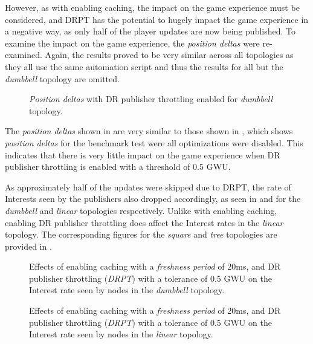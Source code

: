 However, as with enabling caching, the impact on the game experience must be considered, and DRPT has the potential to hugely impact the game experience in a negative way, as only half of the player updates are now being published. To examine the impact on the game experience, the \textit{position deltas} were re-examined. Again, the results proved to be very similar across all topologies as they all use the same automation script and thus the results for all but the \textit{dumbbell} topology are omitted.

\begin{figure}[H]
    \centering
    \caption{\textit{Position deltas} with DR publisher throttling enabled for \textit{dumbbell} topology.}
    \label{fig:eval:caching:dr-pub-throt:pos-deltas:dumbbell}
\end{figure}

The \textit{position deltas} shown in  are very similar to those shown in , which shows \textit{position deltas} for the benchmark test were all optimizations were disabled. This indicates that there is very little impact on the game experience when DR publisher throttling is enabled with a threshold of 0.5 GWU.

As approximately half of the updates were skipped due to DRPT, the rate of Interests seen by the publishers also dropped accordingly, as seen in  and  for the \textit{dumbbell} and \textit{linear} topologies respectively. Unlike with enabling caching, enabling DR publisher throttling does affect the Interest rates in the \textit{linear} topology. The corresponding figures for the \textit{square} and \textit{tree} topologies are provided in .

\begin{figure}[H]
    \centering
    \caption{Effects of enabling caching with a \textit{freshness period} of 20ms, and DR publisher throttling (\textit{DRPT}) with a tolerance of 0.5 GWU on the Interest rate seen by nodes in the \textit{dumbbell} topology.}
    \label{fig:eval:dr-pub-throt:dumbbell-interest-rates}
\end{figure}
 

\begin{figure}[H]
    \centering
    \caption{Effects of enabling caching with a \textit{freshness period} of 20ms, and DR publisher throttling (\textit{DRPT}) with a tolerance of 0.5 GWU on the Interest rate seen by nodes in the \textit{linear} topology.}
    \label{fig:eval:dr-pub-throt:linear-interest-rates}
\end{figure}



